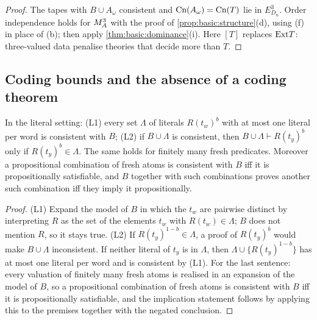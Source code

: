 \begin{proof}
The tapes with $B\cup A_\omega$ consistent and $\mathrm{Cn}(A_\omega)=\mathrm{Cn}(T)$ lie in $E^3_{D_n}$. Order independence holds for $M_{A}^{3}$ with the proof of \cref{prop:basic:structure}(d), using (f) in place of (b); then apply \cref{thm:basic:dominance}(i). Here $[T]$ replaces $\mathrm{Ext} T$: three-valued data penalise theories that decide more than $T$.
\end{proof}

\subsection{Coding bounds and the absence of a coding theorem}\label{app:basic:coding}

\begin{lemma}\label{lem:basic:fresh}
In the literal setting: (L1) every set $\Lambda$ of literals $R(t_w)^b$ with at most one literal per word is consistent with $B$; (L2) if $B\cup\Lambda$ is consistent, then $B\cup\Lambda\vdash R(t_y)^b$ only if $R(t_y)^b\in\Lambda$. The same holds for finitely many fresh predicates. Moreover a propositional combination of fresh atoms is consistent with $B$ iff it is propositionally satisfiable, and $B$ together with such combinations proves another such combination iff they imply it propositionally.
\end{lemma}

\begin{proof}
(L1) Expand the model of $B$ in which the $t_w$ are pairwise distinct by interpreting $R$ as the set of the elements $t_w$ with $R(t_w)\in\Lambda$; $B$ does not mention $R$, so it stays true. (L2) If $R(t_y)^{1-b}\in\Lambda$, a proof of $R(t_y)^b$ would make $B\cup\Lambda$ inconsistent. If neither literal of $t_y$ is in $\Lambda$, then $\Lambda\cup\{R(t_y)^{1-b}\}$ has at most one literal per word and is consistent by (L1). For the last sentence: every valuation of finitely many fresh atoms is realised in an expansion of the model of $B$, so a propositional combination of fresh atoms is consistent with $B$ iff it is propositionally satisfiable, and the implication statement follows by applying this to the premises together with the negated conclusion.
\end{proof}

